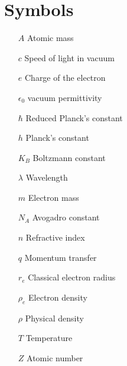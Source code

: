 \section*{Symbols}

\begin{itemize}

        \item[$A$] Atomic mass
        \item[$c$] Speed of light in vacuum        
        \item[$e$] Charge of the electron  
        \item[$\epsilon_0$] vacuum permittivity 
        \item[$\hbar$] Reduced Planck's constant  
        \item[$h$] Planck's constant  
        \item[$K_B$] Boltzmann constant
        \item[$\lambda$] Wavelength  
        \item[$m$] Electron mass
        \item[$N_A$] Avogadro constant
        \item[$n$] Refractive index
        \item[$q$] Momentum transfer  
        \item[$r_e$] Classical electron radius  
        \item[$\rho_e$] Electron density
        \item[$\rho$] Physical density  
        \item[$T$] Temperature  
        \item[$Z$] Atomic number

\end{itemize}

\cleardoublepage
